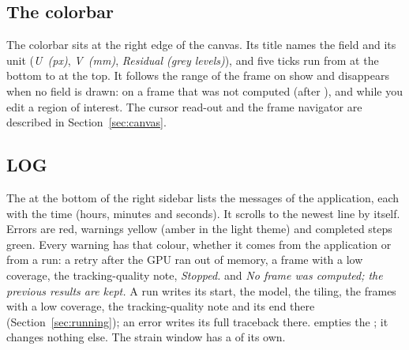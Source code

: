 \subsection{The colorbar}

The colorbar sits at the right edge of the canvas. Its title names the field and its unit
(\emph{U~(px)}, \emph{V~(mm)}, \emph{Residual (grey levels)}), and five ticks run from 
at the bottom to  at the top. It follows the range of the frame on show and disappears
when no field is drawn: on a frame that was not computed (after ), and while you edit
a region of interest. The cursor read-out and the frame navigator are described in
Section~\ref{sec:canvas}.

\subsection{LOG}

The  at the bottom of the right sidebar lists the messages of the application, each with
the time (hours, minutes and seconds). It scrolls to the newest line by itself. Errors are red,
warnings yellow (amber in the light theme) and completed steps green. Every warning has that
colour, whether it comes from the application or from a run: a retry after the GPU ran out of
memory, a frame with a low coverage, the tracking-quality note, \emph{Stopped.} and \emph{No
frame was computed; the previous results are kept.} A run writes its start, the model, the tiling, the frames with a low coverage, the
tracking-quality note and its end there (Section~\ref{sec:running}); an error writes its full
traceback there.  empties the ; it changes nothing else. The strain window has
a  of its own.
